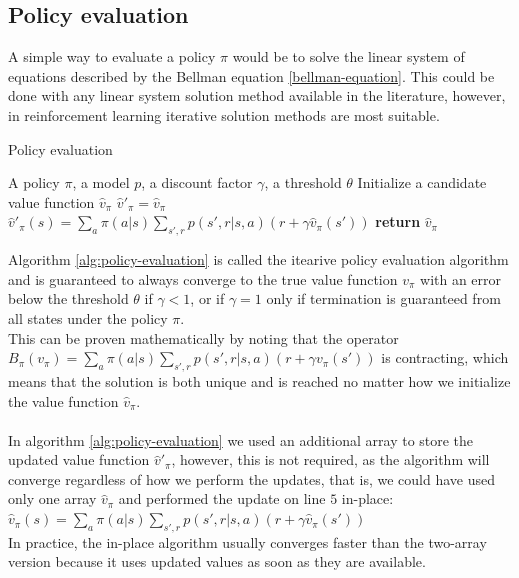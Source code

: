\subsection{Policy evaluation}
A simple way to evaluate a policy $\pi$ would be to solve the linear system of equations described by the Bellman equation \eqref{bellman-equation}. This could be done with any linear system solution method available in the literature, however, in reinforcement learning iterative solution methods are most suitable.
\begin{algorithm}[H]
    \caption{Policy evaluation}
    \label{alg:policy-evaluation}
    \begin{algorithmic}[1]
        \Require A policy $\pi$, a model $p$, a discount factor $\gamma$, a threshold $\theta$
        \State Initialize a candidate value function $\hat{v}_{\pi}$
            \State $\hat{v}'_{\pi} = \hat{v}_{\pi}$
                \State $\hat{v}'_{\pi}(s) = \sum_a \pi(a | s) \sum_{s', r} p(s', r | s, a) (r + \gamma \hat{v}_{\pi}(s'))$
            \EndFor
                \State \textbf{return} $\hat{v}_{\pi}$
            \EndIf
        \EndWhile
    \end{algorithmic}
\end{algorithm}
Algorithm \ref{alg:policy-evaluation} is called the itearive policy evaluation algorithm and is guaranteed to always converge to the true value function $v_{\pi}$ with an error below the threshold $\theta$ if $\gamma < 1$, or if $\gamma = 1$ only if termination is guaranteed from all states under the policy $\pi$.\\
This can be proven mathematically by noting that the operator $B_{\pi}(v_{\pi}) = \sum_a \pi(a | s) \sum_{s', r} p(s', r | s, a) (r + \gamma v_{\pi}(s'))$ is contracting, which means that the solution is both unique and is reached no matter how we initialize the value function $\hat{v}_{\pi}$.\\\\
In algorithm \ref{alg:policy-evaluation} we used an additional array to store the updated value function $\hat{v}'_{\pi}$, however, this is not required, as the algorithm will converge regardless of how we perform the updates, that is, we could have used only one array $\hat{v}_{\pi}$ and performed the update on line $5$ in-place:\\
$\hat{v}_{\pi}(s) = \sum_a \pi(a | s) \sum_{s', r} p(s', r | s, a) (r + \gamma \hat{v}_{\pi}(s'))$\\
In practice, the in-place algorithm usually converges faster than the two-array version because it uses updated values as soon as they are available.

